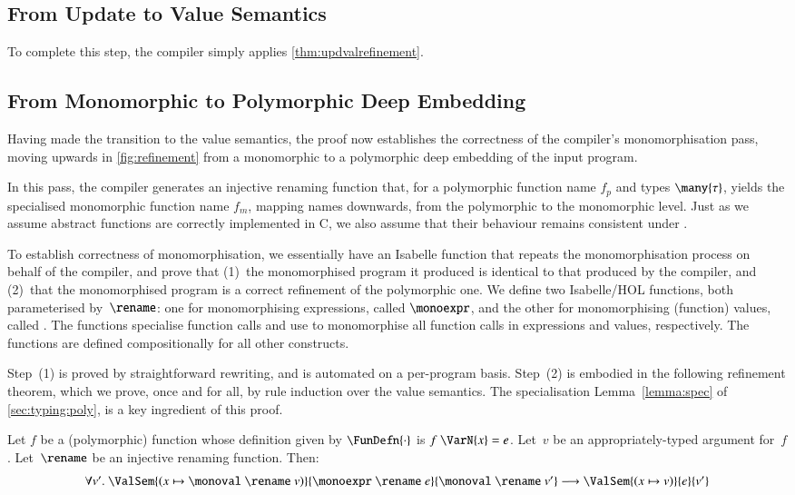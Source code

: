 \documentclass[9pt\ifFinal\else,preprint,nocopyrightspace\fi,\ifAlpha\else natbib,authoryear\fi]{sigplanconf}
\begin{document}
\subsection{From Update to Value Semantics}

To complete this step, the compiler simply applies 
\autoref{thm:updvalrefinement}.

\subsection{From Monomorphic to Polymorphic Deep Embedding}\label{s:mono-correctness}
\label{s:mono}
Having made the transition to the value semantics, the proof now establishes
the correctness of the compiler's monomorphisation pass, moving upwards
in \autoref{fig:refinement} from
a monomorphic to a polymorphic deep embedding of the input program.

In this pass, the compiler generates an injective renaming function \rename that, for a polymorphic function 
name $f_p$ and types $\many{\tau}$, yields the specialised 
monomorphic function name $f_m$, mapping names downwards, from 
the polymorphic to the monomorphic level.
Just as we assume abstract functions are correctly implemented in C, we
also assume that their behaviour
remains consistent under
\rename. 

To establish correctness of monomorphisation, we essentially have an Isabelle
function that repeats the monomorphisation process on behalf of the \CDSL compiler, 
and prove that (1)~the monomorphised
program it produced is identical to that produced by the compiler, and
(2)~that the monomorphised program is a correct refinement of the polymorphic
one.
We define two Isabelle/HOL functions, both parameterised by~$\rename$: 
one for monomorphising expressions,
called $\monoexpr$, and the other for monomorphising (function) values,
called \monoval. 
The functions specialise function calls and use 
\rename to monomorphise 
all function calls in expressions and values, respectively.  
The functions are defined compositionally for all other \CDSL constructs. 

Step~(1) is proved by straightforward rewriting, and is automated on a per-program basis. 
Step~(2) is embodied in the following refinement theorem,
which we prove, once and for all,  by rule induction over the value semantics. 
The specialisation Lemma~\autoref{lemma:spec} of \autoref{sec:typing:poly}, 
is a key ingredient of this proof.


\begin{theorem}[Monomorphisation]
Let $f$ be a (polymorphic) \CDSL function whose definition given by
$\FunDefn{\cdot}$ is $f\ \VarN{x} = e$. Let~$v$ be an appropriately-typed
argument for~$f$. Let~$\rename$ be an injective renaming function. Then:
\[
\begin{array}{l}
\forall v'.\  \ValSem{(x \mapsto \monoval \ \rename \ v)}{\monoexpr\  \rename \ e}{\monoval\ \rename\ v'}
\longrightarrow \ValSem{(x \mapsto v)}{e}{v'}
\end{array}
\]
\end{theorem}
\end{document}
